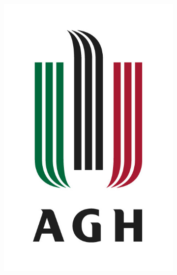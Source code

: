 \begin{figure}[H]
    \centering
    \begin{subfigure}[b]{0.15\textwidth}
        \includegraphics[width=\textwidth]{Content/Images/agh_logo_original.jpg}
    \end{subfigure}
    \begin{subfigure}[b]{0.15\textwidth}

\end{subfigure}
\end{figure}
